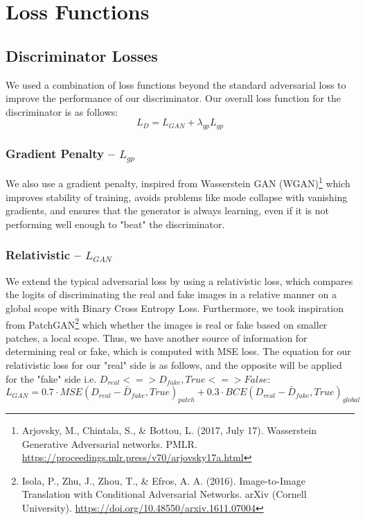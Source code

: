 \documentclass[twoside,english,notitlepage]{report}
\begin{document}
\section{Loss Functions}

\subsection{Discriminator Losses}
We used a combination of loss functions beyond the standard adversarial loss to improve the performance of our discriminator. Our overall loss function for the discriminator is as follows:
\begin{equation}
    L_{D} = L_{GAN} + \lambda_{gp} L_{gp}
\end{equation}

\subsubsection{Gradient Penalty – $L_{gp}$}
We also use a gradient penalty, inspired from Wasserstein GAN (WGAN)\footnote{Arjovsky, M., Chintala, S., \& Bottou, L. (2017, July 17). Wasserstein Generative Adversarial networks. PMLR. \href{https://proceedings.mlr.press/v70/arjovsky17a.html}{https://proceedings.mlr.press/v70/arjovsky17a.html}} which improves stability of training, avoids problems like mode collapse with vanishing gradients, and ensures that the generator is always learning, even if it is not performing well enough to "beat" the discriminator.

\subsubsection{Relativistic – $L_{GAN}$}
We extend the typical adversarial loss by using a relativistic loss, which compares the logits of discriminating the real and fake images in a relative manner on a global scope with Binary Cross Entropy Loss. Furthermore, we took inspiration from PatchGAN\footnote{Isola, P., Zhu, J., Zhou, T., \& Efros, A. A. (2016). Image-to-Image Translation with Conditional Adversarial Networks. arXiv (Cornell University). \href{https://doi.org/10.48550/arxiv.1611.07004}{https://doi.org/10.48550/arxiv.1611.07004}} which whether the images is real or fake based on smaller patches, a local scope. Thus, we have another source of information for determining real or fake, which is computed with MSE loss. The equation for our relativistic loss for our "real" side is as follows, and the opposite will be applied for the "fake" side i.e. $D_{real} <=> D_{fake}, True <=> False$:
\begin{equation}
    L_{GAN} = 0.7 \cdot MSE(D_{real} - \bar{D}_{fake}, True)_{patch} + 0.3 \cdot BCE(D_{real} - \bar{D}_{fake}, True)_{global}
\end{equation}
\end{document}
